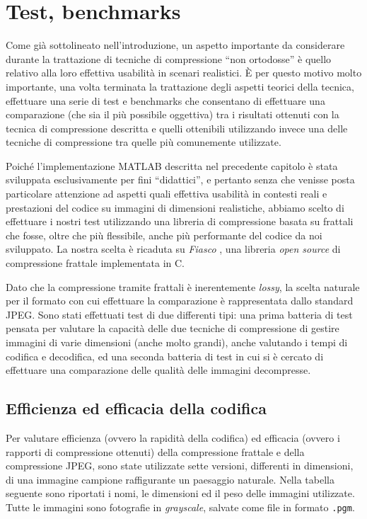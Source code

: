 \documentclass[11pt,a4paper,appendixprefix=true,numbers=noenddot]{scrreprt}
\begin{document}
\chapter{Test, benchmarks}

Come già sottolineato nell'introduzione, un aspetto importante da considerare durante la trattazione di tecniche di compressione ``non ortodosse'' è quello relativo alla loro effettiva usabilità in scenari realistici. È per questo motivo molto importante, una volta terminata la trattazione degli aspetti teorici della tecnica, effettuare una serie di test e benchmarks che consentano di effettuare una comparazione (che sia il più possibile oggettiva) tra i risultati ottenuti con la tecnica di compressione descritta e quelli ottenibili utilizzando invece una delle tecniche di compressione tra quelle più comunemente utilizzate.

Poiché l'implementazione MATLAB descritta nel precedente capitolo è stata sviluppata esclusivamente per fini ``didattici'', e pertanto senza che venisse posta particolare attenzione ad aspetti quali effettiva usabilità in contesti reali e prestazioni del codice su immagini di dimensioni realistiche, abbiamo scelto di effettuare i nostri test utilizzando una libreria di compressione basata su frattali che fosse, oltre che più flessibile, anche più performante del codice da noi sviluppato. La nostra scelta è ricaduta su \emph{Fiasco} \cite{fiasco} \cite{IEEE} \cite{ULL}, una libreria \emph{open source} di compressione frattale implementata in C.

Dato che la compressione tramite frattali è inerentemente \emph{lossy}, la scelta naturale per il formato con cui effettuare la comparazione è rappresentata dallo standard JPEG\cite{jpeg}. Sono stati effettuati test di due differenti tipi: una prima batteria di test pensata per valutare la capacità delle due tecniche di compressione di gestire immagini di varie dimensioni (anche molto grandi), anche valutando i tempi di codifica e decodifica, ed una seconda batteria di test in cui si è cercato di effettuare una comparazione  delle qualità delle immagini decompresse. 

\section{ Efficienza ed efficacia della codifica }

Per valutare efficienza (ovvero la rapidità della codifica) ed efficacia (ovvero i rapporti di compressione ottenuti) della compressione frattale e della compressione JPEG, sono state utilizzate sette versioni, differenti in dimensioni, di una immagine campione raffigurante un paesaggio naturale. Nella tabella seguente sono riportati i nomi, le dimensioni ed il peso delle immagini utilizzate. Tutte le immagini sono fotografie in \emph{grayscale}, salvate come file in formato \texttt{.pgm}.
\end{document}
